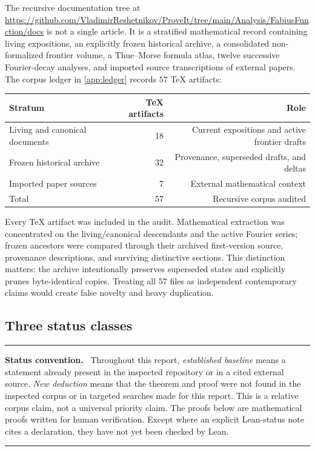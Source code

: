 \documentclass[11pt,oneside]{article}
\numberwithin{equation}{section}
\theoremstyle{plain}
\theoremstyle{definition}
\theoremstyle{remark}
\newenvironment{statusbox}[1]{%
  \par\medskip\noindent\begin{minipage}{\textwidth}%
  \color{DeepBlue}\hrule\vspace{5pt}%
  \color{black}\textbf{\color{DeepBlue}#1.}\ }{%
  \par\vspace{5pt}\color{DeepBlue}\hrule
  \end{minipage}\par\medskip}
\newcommand{\CorpusURL}{\url{https://github.com/VladimirReshetnikov/ProveIt/tree/main/Analysis/FabiusFunction/docs}}
\begin{document}
The recursive documentation tree at \CorpusURL{} is not a single article.  It is a stratified mathematical record containing living expositions, an explicitly frozen historical archive, a consolidated non-formalized frontier volume, a Thue--Morse formula atlas, twelve successive Fourier-decay analyses, and imported source transcriptions of external papers.  The corpus ledger in \cref{app:ledger} records $57$ TeX artifacts:
\begin{center}
\begin{tabular}{@{}lrr@{}}
\toprule
Stratum & TeX artifacts & Role\\
\midrule
Living and canonical documents & 18 & Current expositions and active frontier drafts\\
Frozen historical archive & 32 & Provenance, superseded drafts, and deltas\\
Imported paper sources & 7 & External mathematical context\\
\midrule
Total & 57 & Recursive corpus audited\\
\bottomrule
\end{tabular}
\end{center}

Every TeX artifact was included in the audit.  Mathematical extraction was concentrated on the living/canonical descendants and the active Fourier series; frozen ancestors were compared through their archived first-version source, provenance descriptions, and surviving distinctive sections.  This distinction matters: the archive intentionally preserves superseded states and explicitly prunes byte-identical copies.  Treating all $57$ files as independent contemporary claims would create false novelty and heavy duplication.

\subsection{Three status classes}

\begin{statusbox}{Status convention}
Throughout this report, \emph{established baseline} means a statement already present in the inspected repository or in a cited external source.  \emph{New deduction} means that the theorem and proof were not found in the inspected corpus or in targeted searches made for this report.  This is a relative corpus claim, not a universal priority claim.  The proofs below are mathematical proofs written for human verification.  Except where an explicit Lean-status note cites a declaration, they have not yet been checked by Lean.
\end{statusbox}
\end{document}
